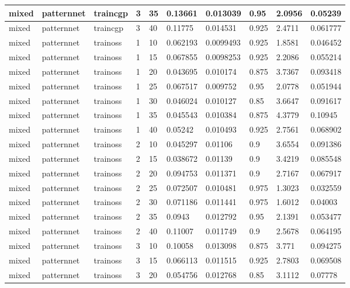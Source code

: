 \begin{longtable}{lllllllll}
mixed & patternnet & traincgp & 3 & 35 & 0.13661 & 0.013039 & 0.95 & 2.0956 & 0.05239 \\ \hline 
mixed & patternnet & traincgp & 3 & 40 & 0.11775 & 0.014531 & 0.925 & 2.4711 & 0.061777 \\ \hline 
mixed & patternnet & trainoss & 1 & 10 & 0.062193 & 0.0099493 & 0.925 & 1.8581 & 0.046452 \\ \hline 
mixed & patternnet & trainoss & 1 & 15 & 0.067855 & 0.0098253 & 0.925 & 2.2086 & 0.055214 \\ \hline 
mixed & patternnet & trainoss & 1 & 20 & 0.043695 & 0.010174 & 0.875 & 3.7367 & 0.093418 \\ \hline 
mixed & patternnet & trainoss & 1 & 25 & 0.067517 & 0.009752 & 0.95 & 2.0778 & 0.051944 \\ \hline 
mixed & patternnet & trainoss & 1 & 30 & 0.046024 & 0.010127 & 0.85 & 3.6647 & 0.091617 \\ \hline 
mixed & patternnet & trainoss & 1 & 35 & 0.045543 & 0.010384 & 0.875 & 4.3779 & 0.10945 \\ \hline 
mixed & patternnet & trainoss & 1 & 40 & 0.05242 & 0.010493 & 0.925 & 2.7561 & 0.068902 \\ \hline 
mixed & patternnet & trainoss & 2 & 10 & 0.045297 & 0.01106 & 0.9 & 3.6554 & 0.091386 \\ \hline 
mixed & patternnet & trainoss & 2 & 15 & 0.038672 & 0.01139 & 0.9 & 3.4219 & 0.085548 \\ \hline 
mixed & patternnet & trainoss & 2 & 20 & 0.094753 & 0.011371 & 0.9 & 2.7167 & 0.067917 \\ \hline 
mixed & patternnet & trainoss & 2 & 25 & 0.072507 & 0.010481 & 0.975 & 1.3023 & 0.032559 \\ \hline 
mixed & patternnet & trainoss & 2 & 30 & 0.071186 & 0.011441 & 0.975 & 1.6012 & 0.04003 \\ \hline 
mixed & patternnet & trainoss & 2 & 35 & 0.0943 & 0.012792 & 0.95 & 2.1391 & 0.053477 \\ \hline 
mixed & patternnet & trainoss & 2 & 40 & 0.11007 & 0.011749 & 0.9 & 2.5678 & 0.064195 \\ \hline 
mixed & patternnet & trainoss & 3 & 10 & 0.10058 & 0.013098 & 0.875 & 3.771 & 0.094275 \\ \hline 
mixed & patternnet & trainoss & 3 & 15 & 0.066113 & 0.011515 & 0.925 & 2.7803 & 0.069508 \\ \hline 
mixed & patternnet & trainoss & 3 & 20 & 0.054756 & 0.012768 & 0.85 & 3.1112 & 0.07778 \\ \hline 

\end{longtable}
